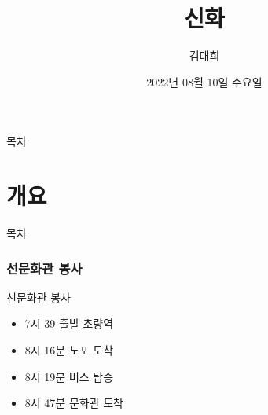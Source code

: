\documentclass[aspectratio=1610,17pt,xcolor=pdftex,dvipsnames,table,handout]{beamer}
\begin{document}
	

			\title{신화 }

			\author{김대희}

			\date{2022년 08월 10일 수요일 }



		\begin{frame}[plain]
		\titlepage
		\end{frame}



		\begin{frame} {목차}
		\tableofcontents
		\end{frame}

		\part{개요 }
		\frame{\partpage}


		\begin{frame} [plain]{목차}
		\tableofcontents
		\end{frame}
		

		\section{선문화관 봉사 }
		

		\begin{frame} [t,plain]
			\begin{block} {선문화관 봉사 }
			\begin{itemize}
				\item 7시 39 출발 초량역
				\item 8시 16분 노포 도착
				\item 8시 19분 버스 탑승
				\item 8시 47분 문화관 도착
			\end{itemize}
			\end{block}
		\end{frame}
\end{document}
